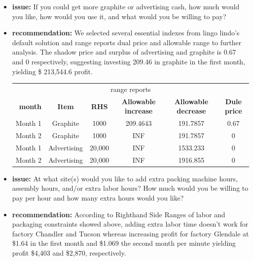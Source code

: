 \documentclass[12pt]{article}
\begin{document}
\begin{itemize}

	\item \textbf{issue:} If you could get more graphite or advertising cash, how much would you like, how would you use it, and what would you be willing to pay?
	
	\item \textbf{recommendation:}
	We selected several essential indexes from lingo lindo’s default solution and range reports dual price and allowable range to further analysis.
The shadow price and surplus of advertising and graphite is 0.67 and 0 respectively, suggesting investing 209.46 in graphite in the first month, yielding \$ 213,544.6 profit.\par
\begin{center}
\begin{tabular}{c c c c c c }
\hline
\multicolumn{6}{c}{range reports} \\
\ \textbf{month} &\textbf{Item} &\textbf{RHS} & \textbf{Allowable increase} & \textbf{Allowable decrease} &  \textbf{Dule price}\\
\hline
Month 1     &Graphite    &1000       &209.4643   &191.7857        &0.67\\
Month 2     &Graphite    &1000       &INF        &191.7857    &0\\
Month 1     &Advertising    &20,000     &INF    &1533.233        &0\\
Month 2     &Advertising    &20,000     &INF    &1916.855       &0\\
\hline
\end{tabular}
\end{center}


	
	\item \textbf{issue:} At what site(s) would you like to add extra packing machine hours, assembly hours, and/or extra labor hours? How much would you be willing to pay per hour and how many extra hours would you like?
	

	\item \textbf{recommendation:}
		According to Righthand Side Ranges of labor and packaging constraints showed above, 
		adding extra labor time doesn't work for factory Chandler and Tucson whereas increasing profit for factory Glendale at \$1.64 in the first month and \$1.069 the second month per minute yielding profit \$4,403 and \$2,870, respectively.
		

\end{itemize}
\end{document}
